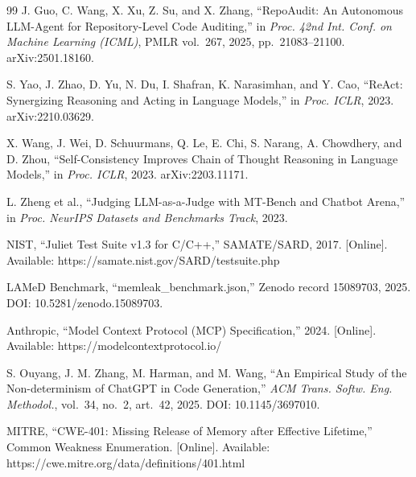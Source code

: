 \documentclass[a4paper]{llncs}
\begin{document}
\begin{thebibliography}{99}
 J. Guo, C. Wang, X. Xu, Z. Su, and X. Zhang, ``RepoAudit: An Autonomous LLM-Agent for Repository-Level Code Auditing,'' in \textit{Proc. 42nd Int. Conf. on Machine Learning (ICML)}, PMLR vol.~267, 2025, pp.~21083--21100. arXiv:2501.18160.

 S. Yao, J. Zhao, D. Yu, N. Du, I. Shafran, K. Narasimhan, and Y. Cao, ``ReAct: Synergizing Reasoning and Acting in Language Models,'' in \textit{Proc. ICLR}, 2023. arXiv:2210.03629.

 X. Wang, J. Wei, D. Schuurmans, Q. Le, E. Chi, S. Narang, A. Chowdhery, and D. Zhou, ``Self-Consistency Improves Chain of Thought Reasoning in Language Models,'' in \textit{Proc. ICLR}, 2023. arXiv:2203.11171.

 L. Zheng et al., ``Judging LLM-as-a-Judge with MT-Bench and Chatbot Arena,'' in \textit{Proc. NeurIPS Datasets and Benchmarks Track}, 2023.

 NIST, ``Juliet Test Suite v1.3 for C/C++,'' SAMATE/SARD, 2017. [Online]. Available: https://samate.nist.gov/SARD/testsuite.php

 LAMeD Benchmark, ``memleak\_benchmark.json,'' Zenodo record 15089703, 2025. DOI: 10.5281/zenodo.15089703.

 Anthropic, ``Model Context Protocol (MCP) Specification,'' 2024. [Online]. Available: https://modelcontextprotocol.io/

 S. Ouyang, J. M. Zhang, M. Harman, and M. Wang, ``An Empirical Study of the Non-determinism of ChatGPT in Code Generation,'' \textit{ACM Trans. Softw. Eng. Methodol.}, vol.~34, no.~2, art.~42, 2025. DOI: 10.1145/3697010.

 MITRE, ``CWE-401: Missing Release of Memory after Effective Lifetime,'' Common Weakness Enumeration. [Online]. Available: https://cwe.mitre.org/data/definitions/401.html

\end{thebibliography}
\end{document}
